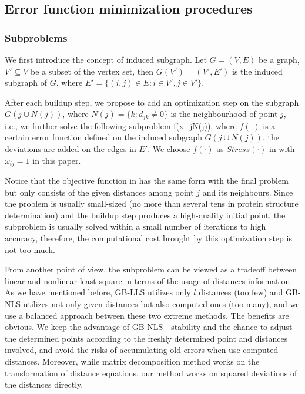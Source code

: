 \documentclass[a4paper,12pt]{article}
\begin{document}
\subsection{Error function minimization procedures}
\subsubsection{Subproblems}
We first introduce the concept of induced subgraph. Let $G=(V,E)$ be a graph, $V'\subseteq V$ be a subset of the vertex set, then $G(V')=(V',E')$ is the induced subgraph of $G$, where $E'=\{(i,j)\in E: i\in V', j\in V'\}$.

After each buildup step, we propose to add an optimization step on the subgraph $G(j\cup N(j))$, where $N(j)=\{k: d_{jk}\neq 0\}$ is the neighbourhood of point $j$, i.e., we further solve the following subproblem
\be \min  f(x_{j\cup N(j)}), \label{prob:sub}\ee
where $f(\cdot)$ is a certain error function defined on the induced subgraph $G(j\cup N(j))$, the deviations are added on the edges in $E'$. We choose $f(\cdot)$ as $Stress(\cdot)$ in  with $\omega_{ij}=1$ in this paper.

Notice that the objective function in  has the same form with the final problem but only consists of the given distances among point $j$ and its neighbours. Since the problem is usually small-sized (no more than  several tens in protein structure determination) and the buildup step produces a high-quality initial point, the subproblem  is usually solved within a small number of iterations to high accuracy, therefore, the computational cost brought by this optimization step is not too much.

From another point of view, the subproblem can be viewed as a tradeoff between linear and nonlinear least square in terms of the usage of distances information. As we have mentioned before, GB-LLS utilizes only $l$ distances (too few) and GB-NLS utilizes not only given distances but also computed ones (too many), and we use a balanced approach between these two extreme methods. The benefits are obvious. We keep the advantage of GB-NLS---stability and the chance to adjust the determined points according to the freshly determined point and distances involved, and avoid the risks of accumulating old errors when use computed distances. Moreover, while matrix decomposition method works on the transformation of distance equations, our method works on squared deviations of the distances directly.
\end{document}
